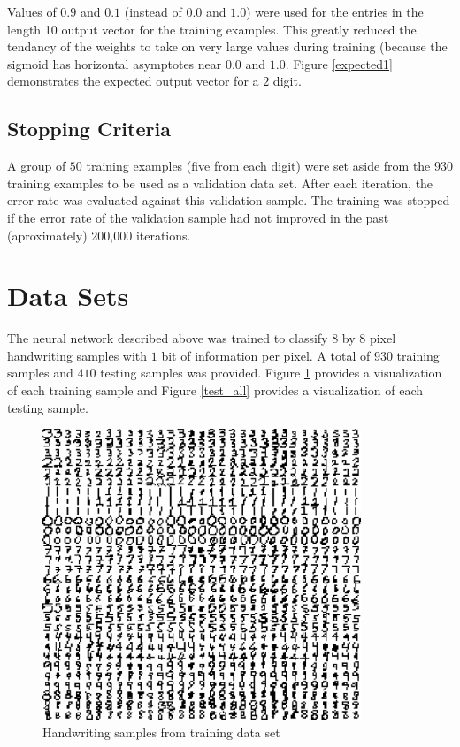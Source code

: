 \documentclass{article}
\begin{document}
Values of \(0.9\) and \(0.1\) (instead of \(0.0\) and \(1.0\)) were used for the entries in the length 10 output vector for the training examples. This greatly reduced the tendancy of the weights to take on very large values during training (because the sigmoid has horizontal asymptotes near \(0.0\) and \(1.0\). Figure \ref{expected1} demonstrates the expected output vector for a \(2\) digit.

\subsection{Stopping Criteria}

A group of \(50\) training examples (five from each digit) were set aside from the \(930\) training examples to be used as a validation data set. After each iteration, the error rate was evaluated against this validation sample. The training was stopped if the error rate of the validation sample had not improved in the past (aproximately) 200,000 iterations.

\section{Data Sets}\label{Dataset}

The neural network described above was trained to classify \(8\) by \(8\) pixel handwriting samples with \(1\) bit of information per pixel. A total of \(930\) training samples and \(410\) testing samples was provided. Figure \ref{train_all} provides a visualization of each training sample and Figure \ref{test_all} provides a visualization of each testing sample.

\begin{figure}
\centering
\includegraphics[width=0.85\textwidth]{data/visualization/all_training_data.png}
\caption{Handwriting samples from training data set}
\label{train_all}
\end{figure}
\end{document}
